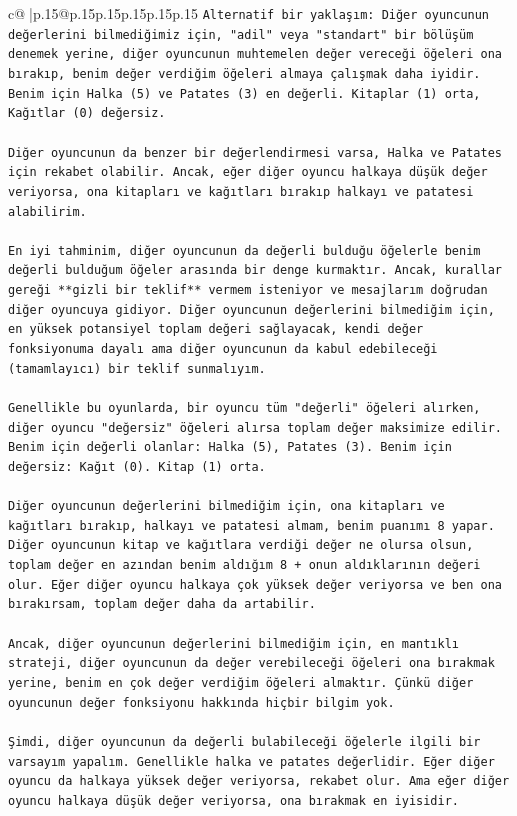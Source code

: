 \documentclass{article}
\begin{document}
{\begin{supertabular}{c@{$\;$}|p{.15\linewidth}@{}p{.15\linewidth}p{.15\linewidth}p{.15\linewidth}p{.15\linewidth}p{.15\linewidth}}
{{{\texttt{Alternatif bir yaklaşım: Diğer oyuncunun değerlerini bilmediğimiz için, "adil" veya "standart" bir bölüşüm denemek yerine, diğer oyuncunun muhtemelen değer vereceği öğeleri ona bırakıp, benim değer verdiğim öğeleri almaya çalışmak daha iyidir. Benim için Halka (5) ve Patates (3) en değerli. Kitaplar (1) orta, Kağıtlar (0) değersiz.} \\
\\ 
\texttt{Diğer oyuncunun da benzer bir değerlendirmesi varsa, Halka ve Patates için rekabet olabilir. Ancak, eğer diğer oyuncu halkaya düşük değer veriyorsa, ona kitapları ve kağıtları bırakıp halkayı ve patatesi alabilirim.} \\
\\ 
\texttt{En iyi tahminim, diğer oyuncunun da değerli bulduğu öğelerle benim değerli bulduğum öğeler arasında bir denge kurmaktır. Ancak, kurallar gereği **gizli bir teklif** vermem isteniyor ve mesajlarım doğrudan diğer oyuncuya gidiyor. Diğer oyuncunun değerlerini bilmediğim için, en yüksek potansiyel toplam değeri sağlayacak, kendi değer fonksiyonuma dayalı ama diğer oyuncunun da kabul edebileceği (tamamlayıcı) bir teklif sunmalıyım.} \\
\\ 
\texttt{Genellikle bu oyunlarda, bir oyuncu tüm "değerli" öğeleri alırken, diğer oyuncu "değersiz" öğeleri alırsa toplam değer maksimize edilir. Benim için değerli olanlar: Halka (5), Patates (3). Benim için değersiz: Kağıt (0). Kitap (1) orta.} \\
\\ 
\texttt{Diğer oyuncunun değerlerini bilmediğim için, ona kitapları ve kağıtları bırakıp, halkayı ve patatesi almam, benim puanımı 8 yapar. Diğer oyuncunun kitap ve kağıtlara verdiği değer ne olursa olsun, toplam değer en azından benim aldığım 8 + onun aldıklarının değeri olur. Eğer diğer oyuncu halkaya çok yüksek değer veriyorsa ve ben ona bırakırsam, toplam değer daha da artabilir.} \\
\\ 
\texttt{Ancak, diğer oyuncunun değerlerini bilmediğim için, en mantıklı strateji, diğer oyuncunun da değer verebileceği öğeleri ona bırakmak yerine, benim en çok değer verdiğim öğeleri almaktır. Çünkü diğer oyuncunun değer fonksiyonu hakkında hiçbir bilgim yok.} \\
\\ 
\texttt{Şimdi, diğer oyuncunun da değerli bulabileceği öğelerle ilgili bir varsayım yapalım. Genellikle halka ve patates değerlidir. Eğer diğer oyuncu da halkaya yüksek değer veriyorsa, rekabet olur. Ama eğer diğer oyuncu halkaya düşük değer veriyorsa, ona bırakmak en iyisidir.} \\
}}}
\end{supertabular}}
\end{document}
